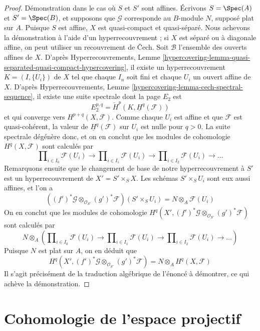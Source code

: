 \begin{proof}
\medskip\noindent
Démonstration dans le cas où $S$ et $S'$ sont affines. Écrivons
$S = \Spec(A)$ et $S' = \Spec(B)$, et supposons que $\mathcal{G}$ corresponde
au $B$-module $N$, supposé plat sur $A$. Puisque $S$ est affine, $X$ est
quasi-compact et quasi-séparé. Nous achevons la démonstration à l'aide d'un
hyperrecouvrement ; si $X$ est séparé ou à diagonale affine, on peut utiliser
un recouvrement de {\v C}ech. Soit $\mathcal{B}$ l'ensemble des ouverts affines
de $X$. D'après Hyperrecouvrements, Lemme
\ref{hypercovering-lemma-quasi-separated-quasi-compact-hypercovering}, il
existe un hyperrecouvrement $K = (I, \{U_i\})$ de $X$ tel que chaque $I_n$ soit
fini et chaque $U_i$ un ouvert affine de $X$. D'après Hyperrecouvrements,
Lemme \ref{hypercovering-lemma-cech-spectral-sequence}, il existe une suite
spectrale dont la page $E_2$ est
$$
E_2^{p, q} = \check{H}^p(K, \underline{H}^q(\mathcal{F}))
$$
et qui converge vers $H^{p + q}(X, \mathcal{F})$. Comme chaque $U_i$ est
affine et que $\mathcal{F}$ est quasi-cohérent, la valeur de
$\underline{H}^q(\mathcal{F})$ sur $U_i$ est nulle pour $q > 0$. La suite
spectrale dégénère donc, et on en conclut que les modules de cohomologie
$H^q(X, \mathcal{F})$ sont calculés par
$$
\prod\nolimits_{i \in I_0} \mathcal{F}(U_i)
\to
\prod\nolimits_{i \in I_1} \mathcal{F}(U_i)
\to
\prod\nolimits_{i \in I_2} \mathcal{F}(U_i)
\to \ldots
$$
Remarquons ensuite que le changement de base de notre hyperrecouvrement à
$S'$ est un hyperrecouvrement de $X' = S' \times_S X$. Les schémas
$S' \times_S U_i$ sont eux aussi affines, et l'on a
$$
\left((f')^*\mathcal{G} \otimes_{\mathcal{O}_{S'}} (g')^*\mathcal{F}\right)
(S' \times_S U_i) =
N \otimes_A \mathcal{F}(U_i)
$$
On en conclut que les modules de cohomologie
$H^q(X', (f')^*\mathcal{G} \otimes_{\mathcal{O}_{S'}} (g')^*\mathcal{F})$
sont calculés par
$$
N \otimes_A \left(
\prod\nolimits_{i \in I_0} \mathcal{F}(U_i)
\to
\prod\nolimits_{i \in I_1} \mathcal{F}(U_i)
\to
\prod\nolimits_{i \in I_2} \mathcal{F}(U_i)
\to \ldots
\right)
$$
Puisque $N$ est plat sur $A$, on en déduit que
$$
H^q(X', (f')^*\mathcal{G} \otimes_{\mathcal{O}_{S'}} (g')^*\mathcal{F})
=
N \otimes_A H^q(X, \mathcal{F})
$$
Il s'agit précisément de la traduction algébrique de l'énoncé à démontrer, ce
qui achève la démonstration.
\end{proof}
\section{Cohomologie de l'espace projectif}
\label{section-cohomology-projective-space}

